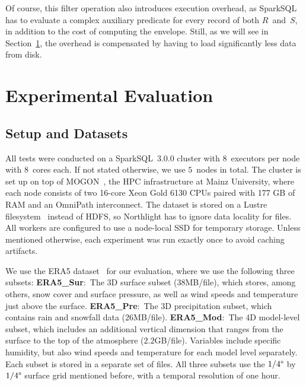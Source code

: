 \documentclass[conference]{IEEEtran}
\newcommand{\system}{Northlight}
\begin{document}
Of course, this filter operation also introduces execution overhead, as SparkSQL has to evaluate a complex auxiliary predicate for every record of both $R$~and~$S$, in addition to the cost of computing the envelope. Still, as we will see in Section~\ref{sec:experiments}, the overhead is compensated by having to load significantly less data from disk. 

\section{Experimental Evaluation}
\label{sec:experiments}


\subsection{Setup and Datasets}

All tests were conducted on a SparkSQL~3.0.0 cluster with $8$~executors per node with $8$~cores each. If not stated otherwise, we use $5$~nodes in total. The cluster is set up on top of MOGON~\cite{lit:mogon}, the HPC infrastructure at Mainz University, where each node consists of two 16-core Xeon Gold 6130 CPUs paired with 177 GB of RAM and an OmniPath interconnect. The dataset is stored on a Lustre filesystem~\cite{lit:lustre} instead of HDFS, so \system{} has to ignore data locality for files.
All workers are configured to use a node-local SSD for temporary storage. Unless mentioned otherwise, each experiment was run exactly once to avoid caching artifacts.

We use the ERA5 dataset~\cite{lit:ecmwf-era5,lit:era5} for our evaluation, where we use the following three subsets:
\textbf{ERA5\_Sur}:~The 3D surface subset ($38$MB/file), which stores, among others, snow cover and surface pressure, as well as wind speeds and temperature just above the surface.
\textbf{ERA5\_Pre}:~The 3D precipitation subset, which contains rain and snowfall data ($26$MB/file).
\textbf{ERA5\_Mod}:~The 4D model-level subset, which includes an additional vertical dimension that ranges from the surface to the top of the atmosphere ($2.2$GB/file). Variables include specific humidity, but also wind speeds and temperature for each model level separately.
Each subset is stored in a separate set of files. 
All three subsets use the $1/4\degree$ by $1/4\degree$ surface grid mentioned before, with a temporal resolution of one hour.
\end{document}
